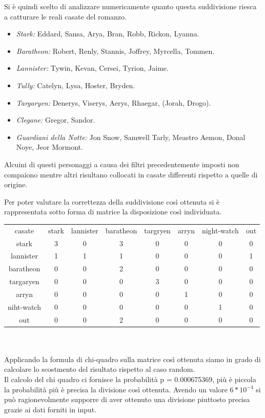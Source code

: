 \documentclass[a4paper]{article}
\begin{document}
Si è quindi scelto di analizzare numericamente quanto questa suddivisione riesca a catturare le reali casate del romanzo.
\begin{itemize}
  \item \emph{Stark:} Eddard, Sansa, Arya, Bran, Robb, Rickon, Lyanna.
  \item \emph{Baratheon:} Robert, Renly, Stannis, Joffrey, Myrcella, Tommen.
  \item \emph{Lannister:} Tywin, Kevan, Cersei, Tyrion, Jaime.
  \item \emph{Tully:} Catelyn, Lysa, Hoster, Bryden.
  \item \emph{Targaryen:} Denerys, Viserys, Aerys, Rhaegar, (Jorah, Drogo).
  \item \emph{Clegane:} Gregor, Sandor.
  \item \emph{Guardiani della Notte:} Jon Snow, Samwell Tarly, Meastro Aemon, Donal Noye, Jeor Mormont.
\end{itemize}

Alcuini di questi personaggi a causa dei filtri precedentemente imposti non compaiono mentre altri risultano collocati in casate differenti rispetto a quelle di origine.

Per poter valutare la correttezza della suddivisione così ottenuta si è rappresentata sotto forma di matrice la  disposizione così individuata.
\\
\begin{tabular}{ c c c c c c c c}
 casate & stark & lannister &  baratheon & targryen & arryn & night-watch & out\\
 stark     & 3 & 0 & 3 & 0 & 0 & 0 & 0\\
 lannister & 1 & 1 & 1 & 0 & 0 & 0 & 1\\
 baratheon & 0 & 0 & 2 & 0 & 0 & 0 & 0\\
 targaryen  & 0 & 0 & 0 & 3 & 0 & 0 & 0\\
 arryn     & 0 & 0 & 0 & 0 & 1 & 0 & 0\\
 niht-watch& 0 & 0 & 0 & 0 & 0 & 1 & 0\\
 out       & 0 & 0 & 2 & 0 & 0 & 0 & 0\\
\end{tabular}
\\
\\
Applicando la formula di chi-quadro sulla matrice così ottenuta siamo in grado di calcolare lo scostmento del risultato rispetto al caso random.\\
Il calcolo del chi quadro ci fornisce la probabilità p = 0.000675369, più è piccola la probabilità più è precisa la divisione così ottenuta. Avendo un valore \begin{math}6*10^{-4}\end{math} si può ragionevolmente supporre di aver ottenuto una divisione piuttosto precisa grazie ai dati forniti in input.
\end{document}
